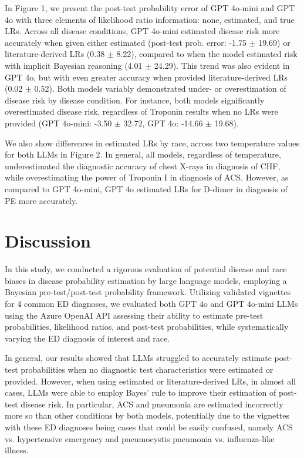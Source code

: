 In Figure 1, we present the post-test probability error of GPT 4o-mini and GPT 4o with three elements of likelihood ratio information: none, estimated, and true LRs. Across all disease conditions, GPT 4o-mini estimated disease risk more accurately when given either estimated (post-test prob. error: -1.75 $\pm$ 19.69) or literature-derived LRs (0.38 $\pm$ 8.22), compared to when the model estimated risk with implicit Bayesian reasoning (4.01 $\pm$ 24.29). This trend was also evident in GPT 4o, but with even greater accuracy when provided literature-derived LRs (0.02 $\pm$ 0.52). Both models variably demonstrated under- or overestimation of disease risk by disease condition. For instance, both models significantly overestimated disease risk, regardless of Troponin results when no LRs were provided (GPT 4o-mini: -3.50 $\pm$ 32.72, GPT 4o: -14.66 $\pm$ 19.68).

We also show differences in estimated LRs by race, across two temperature values for both LLMs in Figure 2.  In general, all models, regardless of temperature, underestimated the diagnostic accuracy of chest X-rays in diagnosis of CHF, while overestimating the power of Troponin I in diagnosis of ACS. However, as compared to GPT 4o-mini, GPT 4o estimated LRs for D-dimer in diagnosis of PE more accurately. 


\section{Discussion}

In this study, we conducted a rigorous evaluation of potential disease and race biases in disease probability estimation by large language models, employing a Bayesian pre-test/post-test probability framework. Utilizing validated vignettes for 4 common ED diagnoses, we evaluated both GPT 4o and GPT 4o-mini LLMs using the Azure OpenAI API assessing their ability to estimate pre-test probabilities, likelihood ratios, and post-test probabilities, while systematically varying the ED diagnosis of interest and race. 

In general, our results showed that LLMs struggled to accurately estimate post-test probabilities when no diagnostic test characteristics were estimated or provided. However, when using estimated or literature-derived LRs, in almost all cases, LLMs were able to employ Bayes' rule to improve their estimation of post-test disease risk. In particular, ACS and pneumonia are estimated incorrectly more so than other conditions by both models, potentially due to the vignettes with these ED diagnoses being cases that could be easily confused, namely ACS vs. hypertensive emergency and pneumocystis pneumonia vs. influenza-like illness. 

